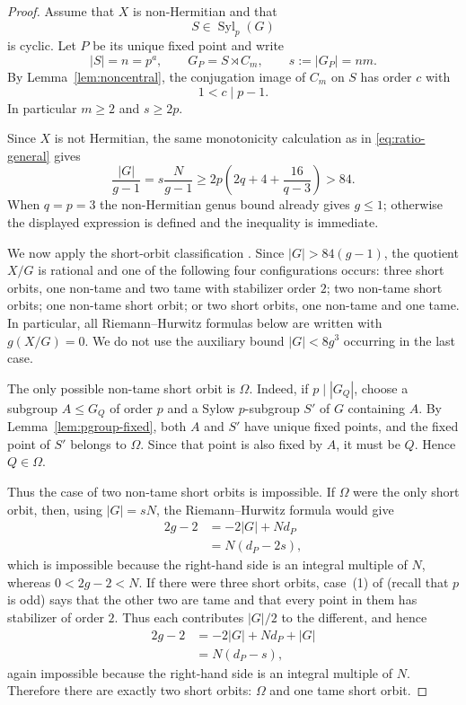 \documentclass[11pt]{amsart}
\theoremstyle{remark}
\newcommand{\Syl}{\operatorname{Syl}}
\begin{document}
\begin{proof}
Assume that $X$ is non-Hermitian and that
\[
          S\in\Syl_p(G)
\]
is cyclic.  Let $P$ be its unique fixed point and write
\[
          |S|=n=p^a,\qquad
          G_P=S\rtimes C_m,\qquad
          s:=|G_P|=nm.
\]
By Lemma~\ref{lem:noncentral}, the conjugation image of $C_m$ on $S$
has order $c$ with
\[
          1<c\mid p-1.
\]
In particular $m\ge2$ and $s\ge2p$.

Since $X$ is not Hermitian, the same monotonicity calculation as in
\eqref{eq:ratio-general} gives
\[
 \frac{|G|}{g-1}
 =s\frac{N}{g-1}
 \ge
 2p\left(2q+4+\frac{16}{q-3}\right)>84.
\]
When $q=p=3$ the non-Hermitian genus bound already gives $g\le1$;
otherwise the displayed expression is defined and the inequality is
immediate.

We now apply the short-orbit classification
\cite[Theorem~2.4]{BMT}.  Since $|G|>84(g-1)$, the quotient $X/G$ is
rational and one of the following four configurations occurs: three
short orbits, one non-tame and two tame with stabilizer order $2$; two
non-tame short orbits; one non-tame short orbit; or two short orbits,
one non-tame and one tame. In particular, all Riemann--Hurwitz formulas
below are written with $g(X/G)=0$. We do not use the auxiliary bound
$|G|<8g^3$ occurring in the last case.

The only possible non-tame short orbit is $\Omega$.  Indeed, if
$p\mid|G_Q|$, choose a subgroup $A\le G_Q$ of order $p$ and a Sylow
$p$-subgroup $S'$ of $G$ containing $A$.  By
Lemma~\ref{lem:pgroup-fixed}, both $A$ and $S'$ have unique fixed
points, and the fixed point of $S'$ belongs to $\Omega$.  Since that
point is also fixed by $A$, it must be $Q$.  Hence $Q\in\Omega$.

Thus the case of two non-tame short orbits is impossible.  If
$\Omega$ were the only short orbit, then, using $|G|=sN$, the
Riemann--Hurwitz formula would give
\[
 \begin{aligned}
 2g-2
   &=-2|G|+N d_P\\
   &=N(d_P-2s),
 \end{aligned}
\]
which is impossible because the right-hand side is an integral
multiple of $N$, whereas $0<2g-2<N$.  If there were three short
orbits, case~\textup{(1)} of \cite[Theorem~2.4]{BMT} (recall that $p$
is odd) says that the other two are tame and that every point in them
has stabilizer of order $2$.  Thus each contributes $|G|/2$ to the
different, and hence
\[
 \begin{aligned}
 2g-2
   &=-2|G|+N d_P+|G|\\
   &=N(d_P-s),
 \end{aligned}
\]
again impossible because the right-hand side is an integral multiple
of $N$.  Therefore there are exactly two short orbits:
$\Omega$ and one tame short orbit.


\end{proof}
\end{document}
